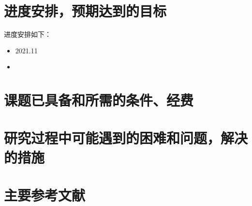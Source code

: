 \section{进度安排，预期达到的目标}

进度安排如下：
\begin{itemize}
    \item 2021.11
    \item 
\end{itemize}

\section{课题已具备和所需的条件、经费}



\section{研究过程中可能遇到的困难和问题，解决的措施}



\section{主要参考文献}



